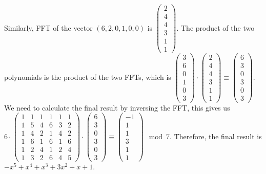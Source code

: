 \documentclass[10pt]{article}
\begin{document}
\begin{solution}
\begin{enumerate}[(a)]
        Similarly, FFT of the vector $(6, 2, 0, 1, 0, 0)$ is $\begin{pmatrix}2 \\ 4 \\ 4 \\ 3 \\ 1 \\ 1\end{pmatrix}$. The product of the two polynomials is the product of the two FFTs, 
        which is $\begin{pmatrix}3 \\ 6 \\ 0 \\ 1 \\ 0 \\ 3\end{pmatrix} \cdot \begin{pmatrix}2 \\ 4 \\ 4 \\ 3 \\ 1 \\ 1\end{pmatrix} \equiv \begin{pmatrix}6 \\3 \\ 0 \\ 3 \\ 0 \\ 3\end{pmatrix}$. 
        We need to calculate the final result by inversing the FFT, this gives us 
        $6 \cdot \begin{pmatrix}
            1 & 1 & 1 & 1 & 1 & 1 \\
            1 & 5 & 4 & 6 & 3 & 2 \\
            1 & 4 & 2 & 1 & 4 & 2 \\
            1 & 6 & 1 & 6 & 1 & 6 \\
            1 & 2 & 4 & 1 & 2 & 4 \\
            1 & 3 & 2 & 6 & 4 & 5
        \end{pmatrix} \cdot \begin{pmatrix}6 \\3 \\ 0 \\ 3 \\ 0 \\ 3\end{pmatrix} \equiv \begin{pmatrix}-1 \\1 \\ 1 \\ 3 \\ 1 \\ 1\end{pmatrix} \mod 7$. Therefore, the final result is $-x^5 + x^4 + x^3 + 3x^2 + x + 1$.
    \end{enumerate}

\end{solution}
\end{document}
